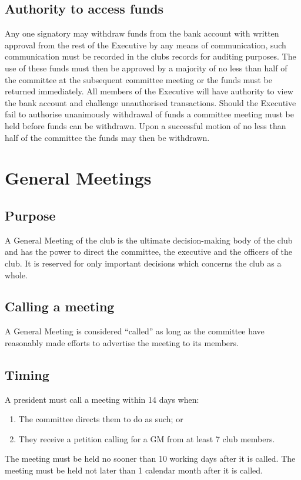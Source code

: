 \documentclass[11pt]{article}
\begin{document}
\subsection{Authority to access funds}
Any one signatory may withdraw funds from the bank account with written approval from the rest of the Executive by any means of communication, such communication must be recorded in the clubs records for auditing purposes. The use of these funds must then be approved by a majority of no less than half of the committee at the subsequent committee meeting or the funds must be returned immediately. All members of the Executive will have authority to view the bank account and challenge unauthorised transactions.
Should the Executive fail to authorise unanimously withdrawal of funds a committee meeting must be held before funds can be withdrawn. Upon a successful motion of no less than half of the committee the funds may then be withdrawn.

\section{General Meetings}\label{generalMeetings}
\subsection{Purpose}
A General Meeting of the club is the ultimate decision-making body of the club and has the power to direct the committee, the executive and the officers of the club. It is reserved for only important decisions which concerns the club as a whole.
\subsection{Calling a meeting}
A General Meeting is considered “called” as long as the committee have reasonably made efforts to advertise the meeting to its members.
\subsection{Timing}
A president must call a meeting within 14 days when:
\begin{enumerate}
    \item The committee directs them to do as such; or
    \item They receive a petition calling for a GM from at least 7 club members.
\end{enumerate}
The meeting must be held no sooner than 10 working days after it is called.
The meeting must be held not later than 1 calendar month after it is called.
\end{document}
